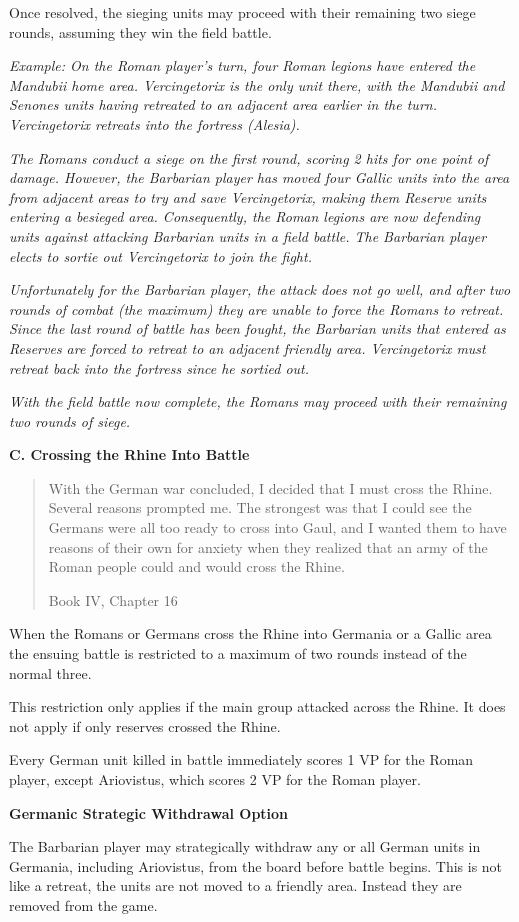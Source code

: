 Once resolved, the sieging units may proceed with their remaining two siege rounds, assuming they win the field battle.

\textit{Example: On the Roman player's turn, four Roman legions have entered the Mandubii home area. Vercingetorix is the only unit there, with the Mandubii and Senones units having retreated to an adjacent area earlier in the turn. Vercingetorix retreats into the fortress (Alesia).}

\textit{The Romans conduct a siege on the first round, scoring 2 hits for one point of damage. However, the Barbarian player has moved four Gallic units into the area from adjacent areas to try and save Vercingetorix, making them Reserve units entering a besieged area. Consequently, the Roman legions are now defending units against attacking Barbarian units in a field battle. The Barbarian player elects to sortie out Vercingetorix to join the fight.}

\textit{Unfortunately for the Barbarian player, the attack does not go well, and after two rounds of combat (the maximum) they are unable to force the Romans to retreat. Since the last round of battle has been fought, the Barbarian units that entered as Reserves are forced to retreat to an adjacent friendly area. Vercingetorix must retreat back into the fortress since he sortied out.}

\textit{With the field battle now complete, the Romans may proceed with their remaining two rounds of siege.}

\textbf{C. Crossing the Rhine Into Battle}
\blockquote[Book IV, Chapter 16]{With the German war concluded, I decided that I must cross the Rhine. Several reasons prompted me. The strongest was that I could see the Germans were all too ready to cross into Gaul, and I wanted them to have reasons of their own for anxiety when they realized that an army of the Roman people could and would cross the Rhine.}
\par
When the Romans or Germans cross the Rhine into Germania or a Gallic area the ensuing battle is restricted to a maximum of two rounds instead of the normal three.

This restriction only applies if the main group attacked across the Rhine. It does not apply if only reserves crossed the Rhine.

Every German unit killed in battle immediately scores 1 VP for the Roman player, except Ariovistus, which scores 2 VP for the Roman player.

\textbf{Germanic Strategic Withdrawal Option}
\par
The Barbarian player may strategically withdraw any or all German units in Germania, including Ariovistus, from the board before battle begins. This is not like a retreat, the units are not moved to a friendly area. Instead they are removed from the game.

